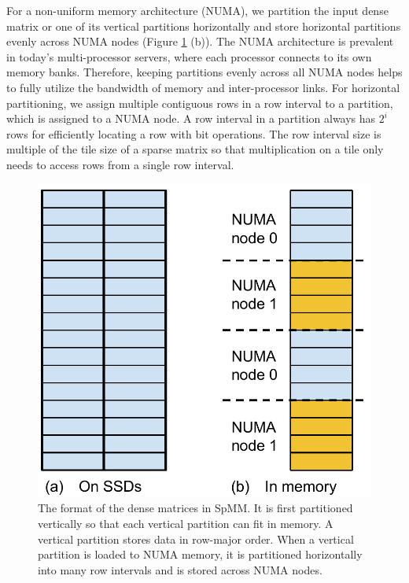 For a non-uniform memory architecture (NUMA), we partition the input dense matrix
or one of its vertical partitions horizontally and store horizontal partitions
evenly across NUMA nodes (Figure \ref{dense_mat} (b)). The NUMA architecture
is prevalent in today's multi-processor servers, where each processor connects
to its own memory banks. Therefore, keeping partitions evenly across all NUMA
nodes helps to fully utilize the bandwidth of memory and inter-processor links.
For horizontal partitioning, we assign multiple contiguous rows in a row
interval to a partition, which is assigned to a NUMA node. A row interval
in a partition always has $2^i$ rows for efficiently locating a row
with bit operations. The row interval size is multiple of the tile size of
a sparse matrix so that multiplication on a tile only needs to access rows
from a single row interval.

\begin{figure}
\centering
\includegraphics[scale=0.4]{SpMM_figs/dense_matrix.pdf}
\caption{The format of the dense matrices in SpMM. It is first partitioned
vertically so that each vertical partition can fit in memory. A vertical
partition stores data in row-major order. When a vertical partition is loaded
to NUMA memory, it is partitioned horizontally into many row intervals and
is stored across NUMA nodes.}
\label{dense_mat}
\end{figure}

